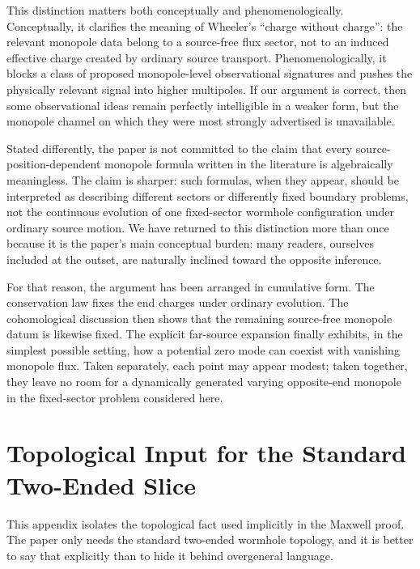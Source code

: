 \documentclass[aps,prd,onecolumn,nofootinbib,superscriptaddress]{revtex4-2}
\begin{document}
This distinction matters both conceptually and phenomenologically. Conceptually, it clarifies the meaning of Wheeler's ``charge without charge'': the relevant monopole data belong to a source-free flux sector, not to an induced effective charge created by ordinary source transport.\cite{Misner1960WormholeInitialConditions,Krasnikov2008ElectrostaticInteraction,GuendelmanEtAl2011HidingCharge} Phenomenologically, it blocks a class of proposed monopole-level observational signatures and pushes the physically relevant signal into higher multipoles. If our argument is correct, then some observational ideas remain perfectly intelligible in a weaker form, but the monopole channel on which they were most strongly advertised is unavailable.

Stated differently, the paper is not committed to the claim that every source-position-dependent monopole formula written in the literature is algebraically meaningless. The claim is sharper: such formulas, when they appear, should be interpreted as describing different sectors or differently fixed boundary problems, not the continuous evolution of one fixed-sector wormhole configuration under ordinary source motion. We have returned to this distinction more than once because it is the paper's main conceptual burden: many readers, ourselves included at the outset, are naturally inclined toward the opposite inference.

For that reason, the argument has been arranged in cumulative form. The conservation law fixes the end charges under ordinary evolution. The cohomological discussion then shows that the remaining source-free monopole datum is likewise fixed. The explicit far-source expansion finally exhibits, in the simplest possible setting, how a potential zero mode can coexist with vanishing monopole flux. Taken separately, each point may appear modest; taken together, they leave no room for a dynamically generated varying opposite-end monopole in the fixed-sector problem considered here.

\appendix

\section{Topological Input for the Standard Two-Ended Slice}

This appendix isolates the topological fact used implicitly in the Maxwell proof. The paper only needs the standard two-ended wormhole topology, and it is better to say that explicitly than to hide it behind overgeneral language.
\end{document}
